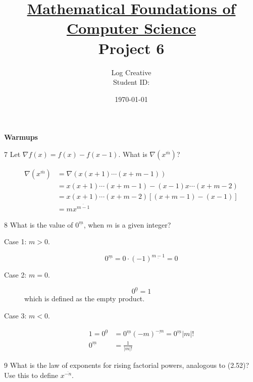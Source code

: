 \documentclass[a4paper,12pt]{article}
\title{\small \underline{Mathematical Foundations of Computer Science}\\\Large Project 6}
\author{Log Creative\\\small Student ID: }
\date{\today}
\makeatletter
\newtheorem*{solution}{Solution}
\theoremstyle{definition}
\renewenvironment{solution}[1][Solution] {\par\pushQED{\qed}\normalfont\topsep6\p@\@plus6\p@\relax\trivlist\item[\hskip\labelsep\bfseries#1\@addpunct{.}]\ignorespaces}{\popQED\endtrivlist\@endpefalse} \makeatother
\newenvironment{problems}{\begin{list}{}{\renewcommand{\makelabel}[1]{\textbf{##1}\hfil}}}{\end{list}}
\makeatother
\begin{document}
\maketitle

\noindent\textbf{Warmups}

\begin{problems}

    \item[7] Let $\nabla f(x)=f(x)-f(x-1)$. What is $\nabla (x^{\overline{m}})$?
    \begin{solution} 
    \begin{align*}
        \nabla (x^{\overline{m}}) &= \nabla (x(x+1)\cdots(x+m-1))\\
        &=x(x+1)\cdots(x+m-1) - (x-1)x\cdots(x+m-2)\\
        &=x(x+1)\cdots(x+m-2)\left[(x+m-1)-(x-1)\right]\\
        &=mx^{\overline{m-1}}
    \end{align*} 
    \end{solution}
    \item[8] What is the value of $0^{\underline{m}}$, when $m$ is a given integer?
    \begin{solution}
        \begin{description}
            \item[Case 1: $m>0$.]  \begin{equation*}
                0^{\underline{m}} = 0\cdot (-1)^{\underline{m-1}} = 0
            \end{equation*}
            \item[Case 2: $m=0$.] \begin{equation*}
                0^{\underline{0}} = 1
            \end{equation*}
            which is defined as the empty product.
            \item[Case 3: $m<0$.] \begin{align*}
                1 = 0^{\underline{0}} &= 0^{\underline{m}}(-m)^{\underline{-m}} = 0^{\underline{m}}|m|!\\
                0^{\underline{m}}&=\frac{1}{|m|!}
            \end{align*}
        \end{description}
    \end{solution} 
    \item[9] What  is  the  law  of  exponents  for  rising  factorial  powers,  analogous  to (2.52)? Use this to define $x^{\overline{-n}}$.
    \begin{solution}

\end{solution}
\end{problems}
\end{document}
